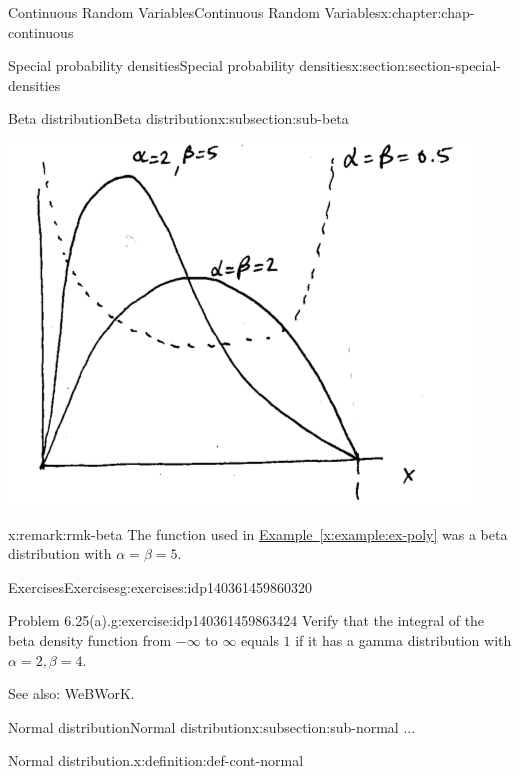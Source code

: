 \documentclass[oneside,10pt,]{book}
\newcommand{\xreffont}{\relax}
\numberwithin{equation}{section}
\begin{document}
\begin{chapterptx}{Continuous Random Variables}{}{Continuous Random Variables}{}{}{x:chapter:chap-continuous}
\begin{sectionptx}{Special probability densities}{}{Special probability densities}{}{}{x:section:section-special-densities}
\begin{subsectionptx}{Beta distribution}{}{Beta distribution}{}{}{x:subsection:sub-beta}
\begin{figureptx}
\begin{image}{0.25}{0.5}{0.25}
\includegraphics[width=\linewidth]{./images/betas.png}
\end{image}%
\tcblower
\end{figureptx}%
\begin{remark}{}{x:remark:rmk-beta}%
The function used in \hyperref[x:example:ex-poly]{Example~{\xreffont\ref{x:example:ex-poly}}} was a beta distribution with \(\alpha=\beta=5\).%
\end{remark}
%
%
\typeout{************************************************}
\typeout{************************************************}
%
\begin{exercises-subsubsection}{Exercises}{}{Exercises}{}{}{g:exercises:idp140361459860320}
\begin{divisionexercise}{1}{Problem 6.25(a).}{}{g:exercise:idp140361459863424}%
Verify that the integral of the beta density function from \(-\infty\) to \(\infty\) equals \(1\) if it has a gamma distribution with \(\alpha=2, \beta=4\).%
\end{divisionexercise}%
See also: WeBWorK.%
\end{exercises-subsubsection}
\end{subsectionptx}
%
%
\typeout{************************************************}
\typeout{************************************************}
%
\begin{subsectionptx}{Normal distribution}{}{Normal distribution}{}{}{x:subsection:sub-normal}
...%
\begin{definition}{Normal distribution.}{x:definition:def-cont-normal}%

\end{definition}
\end{subsectionptx}
\end{sectionptx}
\end{chapterptx}
\end{document}

